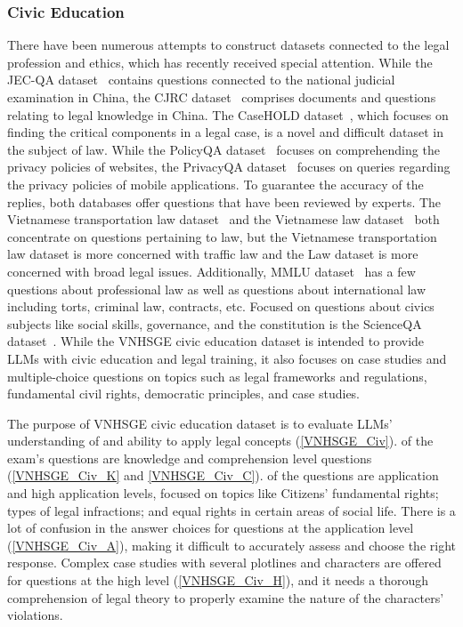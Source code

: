 \documentclass{article}
\begin{document}
{	\subsubsection{Civic Education}
	
	There have been numerous attempts to construct datasets connected to the legal profession and ethics, which has recently received special attention. While the JEC-QA dataset~\cite{zhong2020jec}  contains questions connected to the national judicial examination in China, the CJRC dataset~\cite{duan2019cjrc} comprises documents and questions relating to legal knowledge in China. The CaseHOLD dataset~\cite{zheng2021does}, which focuses on finding the critical components in a legal case, is a novel and difficult dataset in the subject of law. While the PolicyQA dataset~\cite{ravichander2019question} focuses on comprehending the privacy policies of websites, the PrivacyQA dataset~\cite{ahmad2020policyqa} focuses on queries regarding the privacy policies of mobile applications. To guarantee the accuracy of the replies, both databases offer questions that have been reviewed by experts. The Vietnamese transportation law dataset~\cite{bach2017question} and the Vietnamese law dataset~\cite{kien2020answering} both concentrate on questions pertaining to law, but the Vietnamese transportation law dataset is more concerned with traffic law and the Law dataset is more concerned with broad legal issues. Additionally, MMLU dataset~\cite{hendrycks2020measuring} has a few questions about professional law as well as questions about international law including torts, criminal law, contracts, etc. Focused on questions about civics subjects like social skills, governance, and the constitution is the ScienceQA dataset~\cite{lu2022learn}. While the VNHSGE civic education dataset is intended to provide LLMs with civic education and legal training, it also focuses on case studies and multiple-choice questions on topics such as legal frameworks and regulations, fundamental civil rights, democratic principles, and case studies.
	
	The purpose of VNHSGE civic education dataset is to evaluate LLMs' understanding of and ability to apply legal concepts (\ref{VNHSGE_Civ}).  of the exam's questions are knowledge and comprehension level questions (\ref{VNHSGE_Civ_K} and \ref{VNHSGE_Civ_C}).  of the questions are application and high application levels, focused on topics like Citizens' fundamental rights; types of legal infractions; and equal rights in certain areas of social life. There is a lot of confusion in the answer choices for questions at the application level (\ref{VNHSGE_Civ_A}), making it difficult to accurately assess and choose the right response. Complex case studies with several plotlines and characters are offered for questions at the high level (\ref{VNHSGE_Civ_H}), and it needs a thorough comprehension of legal theory to properly examine the nature of the characters' violations.
	
}
\end{document}
